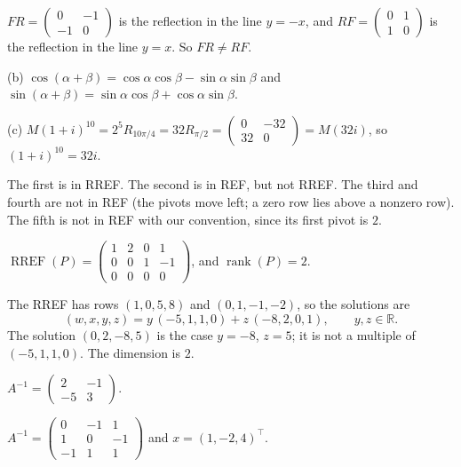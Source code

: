 \documentclass[11pt]{article}
\theoremstyle{definition}
\DeclareMathOperator{\rank}{rank}
\DeclareMathOperator{\RREF}{RREF}
\begin{document}
\begin{description}[leftmargin=0pt, itemsep=0.3em]
    \item[\ref{pr:reflect-rotate}.] $FR = \begin{pmatrix} 0 & -1 \\ -1 & 0 \end{pmatrix}$ is the reflection in the line $y = -x$, and $RF = \begin{pmatrix} 0 & 1 \\ 1 & 0 \end{pmatrix}$ is the reflection in the line $y = x$. So $FR \neq RF$.
    \item[\ref{pr:rotation-addition}.] (b) $\cos(\alpha + \beta) = \cos\alpha\cos\beta - \sin\alpha\sin\beta$ and $\sin(\alpha + \beta) = \sin\alpha\cos\beta + \cos\alpha\sin\beta$.
    \item[\ref{pr:complex-matrix}.] (c) $M(1 + i)^{10} = 2^5 R_{10\pi/4} = 32 R_{\pi/2} = \begin{pmatrix} 0 & -32 \\ 32 & 0 \end{pmatrix} = M(32i)$, so $(1 + i)^{10} = 32i$.
    \item[\ref{pr:ref}.] The first is in RREF. The second is in REF, but not RREF. The third and fourth are not in REF (the pivots move left; a zero row lies above a nonzero row). The fifth is not in REF with our convention, since its first pivot is $2$.
    \item[\ref{pr:rref-compute}.] $\RREF(P) = \begin{pmatrix} 1 & 2 & 0 & 1 \\ 0 & 0 & 1 & -1 \\ 0 & 0 & 0 & 0 \end{pmatrix}$, and $\rank(P) = 2$.
    \item[\ref{pr:system}.] The RREF has rows $(1, 0, 5, 8)$ and $(0, 1, -1, -2)$, so the solutions are
    \[(w, x, y, z) = y\,(-5, 1, 1, 0) + z\,(-8, 2, 0, 1), \qquad y, z \in \mathbb{R}.\]
    The solution $(0, 2, -8, 5)$ is the case $y = -8$, $z = 5$; it is not a multiple of $(-5, 1, 1, 0)$. The dimension is $2$.
    \item[\ref{pr:inverse2}.] $A^{-1} = \begin{pmatrix} 2 & -1 \\ -5 & 3 \end{pmatrix}$.
    \item[\ref{pr:inverse3}.] $A^{-1} = \begin{pmatrix} 0 & -1 & 1 \\ 1 & 0 & -1 \\ -1 & 1 & 1 \end{pmatrix}$ and $x = (1, -2, 4)^\top$.

\end{description}
\end{document}
